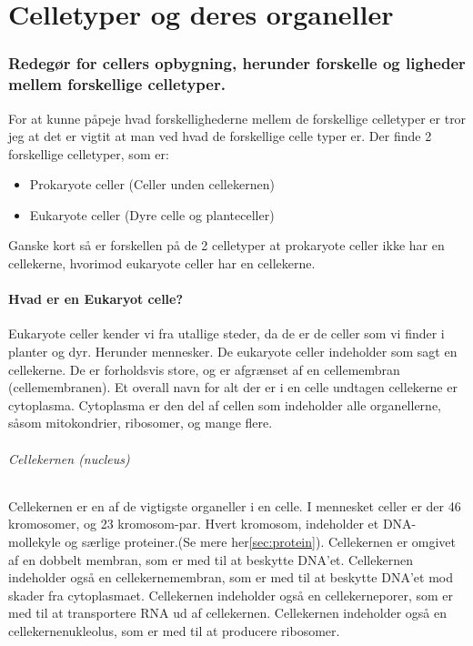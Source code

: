 \newpage
\part{Celletyper og deres organeller}\label{sec:celletyperogderesorganeller}
    \section{Redegør for cellers opbygning, herunder forskelle og ligheder mellem forskellige celletyper.}
        For at kunne påpeje hvad forskellighederne mellem de forskellige celletyper er tror jeg at det er vigtit at man ved hvad de forskellige celle typer er. 
        Der finde 2 forskellige celletyper, som er:
        \begin{itemize}
            \item Prokaryote celler (Celler unden cellekernen)
            \item Eukaryote celler (Dyre celle og planteceller)
        \end{itemize}
        Ganske kort så er forskellen på de 2 celletyper at prokaryote celler ikke har en cellekerne, hvorimod eukaryote celler har en cellekerne.
        \subsection{Hvad er en Eukaryot celle?}
            Eukaryote celler kender vi fra utallige steder, da de er de celler som vi finder i planter og dyr. Herunder mennesker.
            De eukaryote celler indeholder som sagt en cellekerne. De er forholdsvis store, og er afgrænset af en cellemembran (cellemembranen). 
            Et overall navn for alt der er i en celle undtagen cellekerne er cytoplasma. Cytoplasma er den del af cellen som indeholder alle organellerne, såsom mitokondrier, ribosomer, og mange flere.
            \paragraph{Cellekernen (nucleus)}
                Cellekernen er en af de vigtigste organeller i en celle. I mennesket celler er der 46 kromosomer, og 23 kromosom-par. Hvert kromosom, indeholder et DNA-mollekyle og særlige proteiner.(Se mere her\ref{sec:protein}).
                Cellekernen er omgivet af en dobbelt membran, som er med til at beskytte DNA'et. 
                Cellekernen indeholder også en cellekernemembran, som er med til at beskytte DNA'et mod skader fra cytoplasmaet.
                Cellekernen indeholder også en cellekerneporer, som er med til at transportere RNA ud af cellekernen.
                Cellekernen indeholder også en cellekernenukleolus, som er med til at producere ribosomer.
